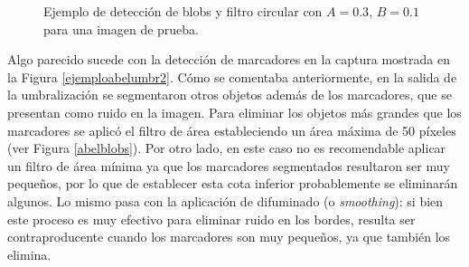\begin{figure}[H]
  \caption{Ejemplo de detección de blobs y filtro circular con $A=0.3$, $B=0.1$ para una imagen de prueba.}
      \label{ejemplodetectCirculos}
\end{figure}

Algo parecido sucede con la detección de marcadores en la captura mostrada en la Figura \ref{ejemploabelumbr2}. Cómo se comentaba anteriormente, en la salida de la umbralización se segmentaron otros objetos además de los marcadores, que se presentan como ruido en la imagen. Para eliminar los objetos más grandes que los marcadores se aplicó el filtro de área estableciendo un área máxima de 50 píxeles (ver Figura \ref{abelblobs}). Por otro lado, en este caso no es recomendable aplicar un filtro de área mínima ya que los marcadores segmentados resultaron ser muy pequeños, por lo que de establecer esta cota inferior probablemente se eliminarán algunos. Lo mismo pasa con la aplicación de difuminado (o \textit{smoothing}): si bien este proceso es muy efectivo para eliminar ruido en los bordes, resulta ser contraproducente cuando los marcadores son muy pequeños, ya que también los elimina.

